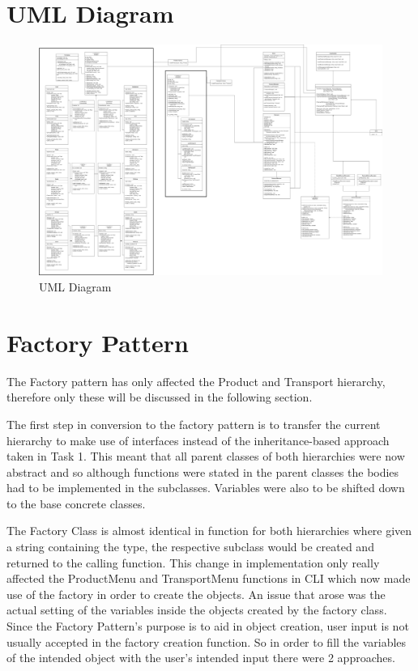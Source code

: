 \documentclass[12pt, a4paper]{report}
\begin{document}
\section{UML Diagram}
\begin{figure}[!htp]
  \centering
    \includegraphics[width=15cm]{Images/OOP UML Diagram 2.drawio.png}
    \caption{UML Diagram}
  \hfill
\end{figure}

\section{Factory Pattern}
The Factory pattern has only affected the Product and Transport hierarchy, therefore only these will be discussed in the following section.

The first step in conversion to the factory pattern is to transfer the current hierarchy to make use of interfaces instead of the inheritance-based approach taken in Task 1. This meant that all parent classes of both hierarchies were now abstract and so although functions were stated in the parent classes the bodies had to be implemented in the subclasses. Variables were also to be shifted down to the base concrete classes. 

The Factory Class is almost identical in function for both hierarchies where given a string containing the type, the respective subclass would be created and returned to the calling function. This change in implementation only really affected the ProductMenu and TransportMenu functions in CLI which now made use of the factory in order to create the objects. An issue that arose was the actual setting of the variables inside the objects created by the factory class. Since the Factory Pattern's purpose is to aid in object creation, user input is not usually accepted in the factory creation function. So in order to fill the variables of the intended object with the user's intended input there were 2 approaches. 
\end{document}
